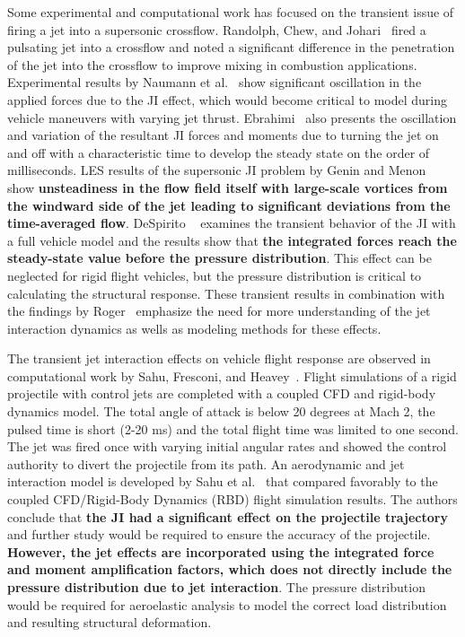 \documentclass[12pt]{article}
\begin{document}
Some experimental and computational work has focused on the transient issue of firing a jet into a supersonic crossflow. Randolph, Chew, and Johari~\cite{Randolph1994} fired a pulsating jet into a crossflow and noted a significant difference in the penetration of the jet into the crossflow to improve mixing in combustion applications. Experimental results by Naumann et al.~\cite{Naumann1998} show significant oscillation in the applied forces due to the JI effect, which would become critical to model during vehicle maneuvers with varying jet thrust. Ebrahimi~\cite{Ebrahimi2000} also presents the oscillation and variation of the resultant JI forces and moments due to turning the jet on and off with a characteristic time to develop the steady state on the order of milliseconds. LES results of the supersonic JI problem by Genin and Menon~\cite{Génin01012010} show \textbf{unsteadiness in the flow field itself with large-scale vortices from the windward side of the jet leading to significant deviations from the time-averaged flow}. DeSpirito ~\cite{despirito2012transient} examines the transient behavior of the JI with a full vehicle model and the results show that \textbf{the integrated forces reach the steady-state value before the pressure distribution}. This effect can be neglected for rigid flight vehicles, but the pressure distribution is critical to calculating the structural response. These transient results in combination with the findings by Roger~\cite{roger1999aerodynamics} emphasize the need for more understanding of the jet interaction dynamics as wells as modeling methods for these effects.

The transient jet interaction effects on vehicle flight response are observed in computational work by Sahu, Fresconi, and Heavey~\cite{sahu2024}. Flight simulations of a rigid projectile with control jets are completed with a coupled CFD and rigid-body dynamics model. The total angle of attack is below 20 degrees at Mach 2, the pulsed time is short (2-20 ms) and the total flight time was limited to one second. The jet was fired once with varying initial angular rates and showed the control authority to divert the projectile from its path. An aerodynamic and jet interaction model is developed by Sahu et al.~\cite{sahu2024} that compared favorably to the coupled CFD/Rigid-Body Dynamics (RBD) flight simulation results. The authors conclude that \textbf{the JI had a significant effect on the projectile trajectory} and further study would be required to ensure the accuracy of the projectile.\textbf{ However, the jet effects are incorporated using the integrated force and moment amplification factors, which does not directly include the pressure distribution due to jet interaction}. The pressure distribution would be required for aeroelastic analysis to model the correct load distribution and resulting structural deformation.
\end{document}
